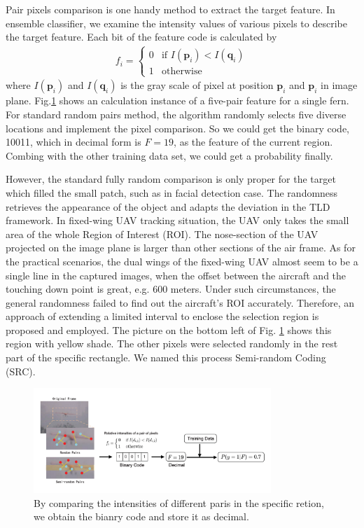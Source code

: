 Pair pixels comparison is one handy method to extract the target feature. In ensemble classifier, we examine the intensity values of various pixels to describe the target feature. Each bit of the feature code is calculated by
\begin{align}
	f_i=\left\{ \begin{array}{ll}
		0 &\mbox{if $I(\mathbf{p}_i) < I(\mathbf{q}_i)$} \\
		1 &\mbox{otherwise} \end{array} \right.
\end{align}
where $I(\mathbf{p}_i)$ and $I(\mathbf{q}_i)$ is the gray scale of pixel at position $\mathbf{p}_i$  and $\mathbf{p}_i$ in image plane. Fig.\ref{fig:01_TLD_Code} shows an calculation instance of a five-pair feature for a single fern. For standard random pairs method, the algorithm randomly selects five diverse locations and implement the pixel comparison. So we could get the binary code, 10011, which in decimal form is $F=19$, as the feature of the current region. Combing with the other training data set, we could get a probability finally.

However, the standard fully random comparison is only proper for the target which filled the small patch, such as in facial detection case. The randomness retrieves the appearance of the object and adapts the deviation in the TLD framework. In fixed-wing UAV tracking situation, the UAV only takes the small area of the whole Region of Interest (ROI). The nose-section of the UAV projected on the image plane is larger than other sections of the air frame. As for the practical scenarios, the dual wings of the fixed-wing UAV almost seem to be a single line in the captured images, when the offset between the aircraft and the touching down point is great, e.g. 600 meters. Under such circumstances, the general randomness failed to find out the aircraft's ROI accurately. Therefore, an approach of extending a limited interval to enclose the selection region is proposed and employed. The picture on the bottom left of Fig. \ref{fig:01_TLD_Code} shows this region with yellow shade. The other pixels were selected randomly in the rest part of the specific rectangle. We named this process Semi-random Coding (SRC). 

\begin{figure}[!th]
	\centering
	\includegraphics[width=0.8\textwidth]{Figs/01_TLD_Code.pdf}
	\caption{By comparing the intensities of different paris in the specific retion, we obtain the bianry code and store it as decimal.}
	\label{fig:01_TLD_Code}    
\end{figure}

